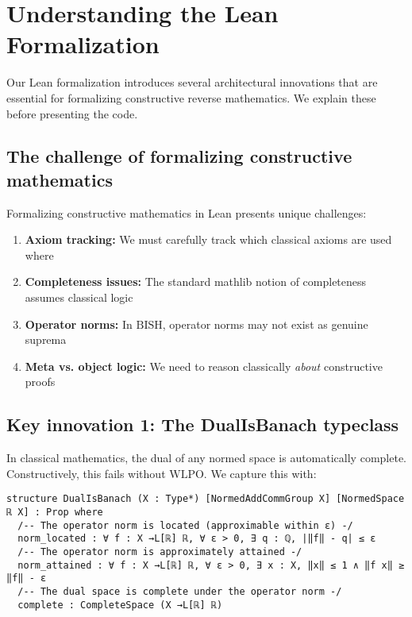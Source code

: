 \documentclass[11pt]{article}  %
\newcommand{\WLPO}{\mathrm{WLPO}}
\newcommand{\BISH}{\mathrm{BISH}}
\begin{document}
\section{Understanding the Lean Formalization}\label{sec:lean-arch}

Our Lean formalization introduces several architectural innovations that are essential for formalizing constructive reverse mathematics. We explain these before presenting the code.

\subsection{The challenge of formalizing constructive mathematics}

Formalizing constructive mathematics in Lean presents unique challenges:

\begin{enumerate}
\item \textbf{Axiom tracking:} We must carefully track which classical axioms are used where
\item \textbf{Completeness issues:} The standard mathlib notion of completeness assumes classical logic
\item \textbf{Operator norms:} In $\BISH$, operator norms may not exist as genuine suprema
\item \textbf{Meta vs. object logic:} We need to reason classically \emph{about} constructive proofs
\end{enumerate}

\subsection{Key innovation 1: The DualIsBanach typeclass}

In classical mathematics, the dual of any normed space is automatically complete. Constructively, this fails without $\WLPO$. We capture this with:

\begin{lstlisting}[caption={DualIsBanach typeclass (key excerpt)}]
structure DualIsBanach (X : Type*) [NormedAddCommGroup X] [NormedSpace ℝ X] : Prop where
  /-- The operator norm is located (approximable within ε) -/
  norm_located : ∀ f : X →L[ℝ] ℝ, ∀ ε > 0, ∃ q : ℚ, |‖f‖ - q| ≤ ε
  /-- The operator norm is approximately attained -/
  norm_attained : ∀ f : X →L[ℝ] ℝ, ∀ ε > 0, ∃ x : X, ‖x‖ ≤ 1 ∧ ‖f x‖ ≥ ‖f‖ - ε
  /-- The dual space is complete under the operator norm -/
  complete : CompleteSpace (X →L[ℝ] ℝ)
\end{lstlisting}
\end{document}
